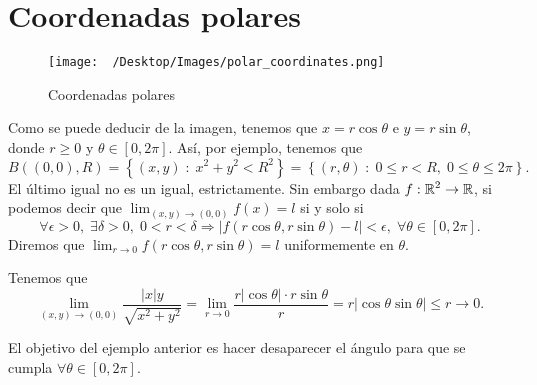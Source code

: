 \section{Coordenadas polares}
\begin{figure}[h!]
 \centering
  \texttt{[image: ~/Desktop/Images/polar\_coordinates.png]}
 \caption{Coordenadas polares}
 \end{figure}
Como se puede deducir de la imagen, tenemos que $\displaystyle x = r\cos\theta $ e $\displaystyle y = r\sin \theta $, donde $\displaystyle r \geq 0 $ y $\displaystyle \theta \in [0,2\pi] $. Así, por ejemplo, tenemos que 
\[ B\left(\left(0,0\right), R\right) = \left\{ \left(x,y\right) \; : \; x^{2} +y^{2}<R^{2}\right\} = \left\{ \left(r, \theta \right) \; : \; 0 \leq r < R, \; 0 \leq \theta \leq 2\pi \right\}  .\]
El último igual no es un igual, estrictamente. Sin embargo dada $\displaystyle f: \mathbb{R}^{2} \to \mathbb{R} $, si podemos decir que $\displaystyle \lim_{\left(x,y\right) \to \left(0,0\right)}f\left(x\right) = l $ si y solo si 
\[\forall \epsilon > 0, \; \exists \delta > 0, \; 0 < r < \delta \Rightarrow \left|f\left(r \cos \theta, r \sin \theta\right)-l\right| < \epsilon, \; \forall \theta \in [0,2\pi].\]
Diremos que $\displaystyle \lim_{r \to 0}f\left(r \cos \theta, r \sin \theta\right)= l $ uniformemente en $\displaystyle \theta  $. 
\begin{eg}
Tenemos que
\[\lim_{\left(x,y\right) \to \left(0,0\right)}\frac{ \left|x\right|y}{\sqrt{x^{2}+y^{2}}}  = \lim_{r \to 0} \frac{r \left|\cos \theta\right| \cdot r \sin\theta}{r} = r \left|\cos\theta \sin \theta\right|\leq r \to 0 .\]
\end{eg}
\begin{observation}
	El objetivo del ejemplo anterior es hacer desaparecer el ángulo para que se cumpla $\displaystyle \forall \theta \in [0,2\pi] $. 
\end{observation}

